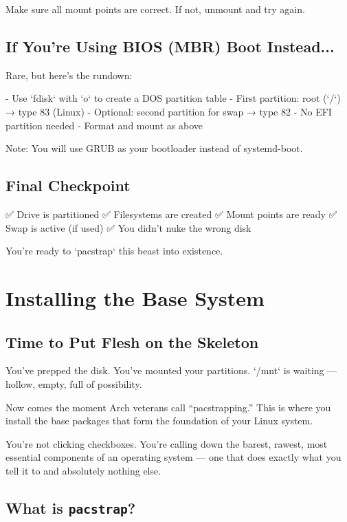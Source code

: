 \documentclass[12pt,openany]{book}
\begin{document}
Make sure all mount points are correct. If not, unmount and try again.

\section{If You’re Using BIOS (MBR) Boot Instead...}

Rare, but here’s the rundown:

- Use `fdisk` with `o` to create a DOS partition table
- First partition: root (`/`) → type 83 (Linux)
- Optional: second partition for swap → type 82
- No EFI partition needed
- Format and mount as above

Note: You will use GRUB as your bootloader instead of systemd-boot.

\section{Final Checkpoint}

✅ Drive is partitioned  
✅ Filesystems are created  
✅ Mount points are ready  
✅ Swap is active (if used)  
✅ You didn’t nuke the wrong disk

You're ready to `pacstrap` this beast into existence.

\clearpage


\chapter{Installing the Base System}

\section*{Time to Put Flesh on the Skeleton}

You’ve prepped the disk. You’ve mounted your partitions. `/mnt` is waiting — hollow, empty, full of possibility.

Now comes the moment Arch veterans call “pacstrapping.” This is where you install the base packages that form the foundation of your Linux system.

You’re not clicking checkboxes. You’re calling down the barest, rawest, most essential components of an operating system — one that does exactly what you tell it to and absolutely nothing else.

\section{What is \texttt{pacstrap}?}
\end{document}

